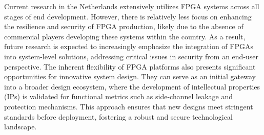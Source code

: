 Current research in the Netherlands extensively utilizes FPGA systems across all stages of end development. However, there is relatively less focus on enhancing the resilience and security of FPGA production, likely due to the absence of commercial players developing these systems within the country. As a result, future research is expected to increasingly emphasize the integration of FPGAs into system-level solutions, addressing critical issues in security from an end-user perspective. The inherent flexibility of FPGA platforms also presents significant opportunities for innovative system design. They can serve as an initial gateway into a broader design ecosystem, where the development of intellectual properties (IPs) is validated for functional metrics such as side-channel leakage and protection mechanisms. This approach ensures that new designs meet stringent standards before deployment, fostering a robust and secure technological landscape.